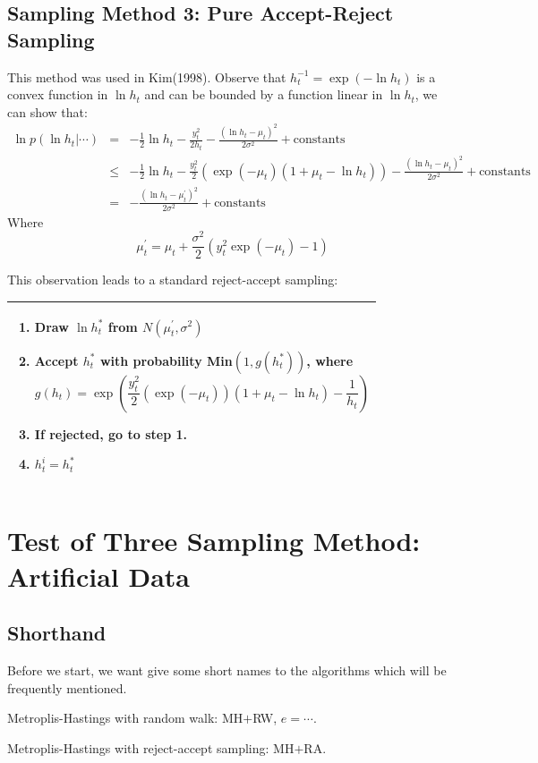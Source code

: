 \documentclass{article}
\begin{document}
\subsection{Sampling Method 3: Pure Accept-Reject Sampling}
This method was used in Kim(1998). Observe that $h_t^{-1}=\exp(-\ln h_t)$ is a convex function in $\ln h_t$ and can be bounded by a function linear in $\ln h_t$, we can show that:
\begin{eqnarray}
\ln{p(\ln h_t|\cdots)}&=&-\frac{1}{2}\ln h_t-\frac{y_t^2}{2h_t}-\frac{(\ln h_t-\mu_t)^2}{2\sigma^2}+\textrm{constants}\nonumber\\
&\leq&-\frac{1}{2}\ln h_t-\frac{y_t^2}{2}\left(\exp(-\mu_t)(1+\mu_t-\ln h_t)\right)-\frac{(\ln h_t-\mu_t)^2}{2\sigma^2}+\textrm{constants}\nonumber\\
&=&-\frac{(\ln h_t-\mu^\prime_t)^2}{2\sigma^2}+\textrm{constants}
\end{eqnarray}
Where
\[
\mu^\prime_t=\mu_t+\frac{\sigma^2}{2}(y_t^2\exp(-\mu_t)-1)
\]

This observation leads to a standard reject-accept sampling:

\begin{tabular}{|p{11cm}|}
\hline
\begin{enumerate}
\item
Draw $\ln h^*_t$ from $N(\mu^\prime_t,\sigma^2)$
\item
Accept $h^*_t$ with probability Min$(1,g(h^*_t))$, where
\[
g(h_t)=\exp(\frac{y_t^2}{2}(\exp(-\mu_t))(1+\mu_t-\ln h_t)-\frac{1}{h_t})
\]
\item
If rejected, go to step 1.
\item
$h^i_t=h^*_t$
\end{enumerate}\\
\hline
\end{tabular}

\section{Test of Three Sampling Method: Artificial Data}
\subsection{Shorthand}
Before we start, we want give some short names to the algorithms which will be frequently mentioned.

Metroplis-Hastings with random walk: MH$+$RW, $e=\cdots$.

Metroplis-Hastings with reject-accept sampling: MH$+$RA.
\end{document}

